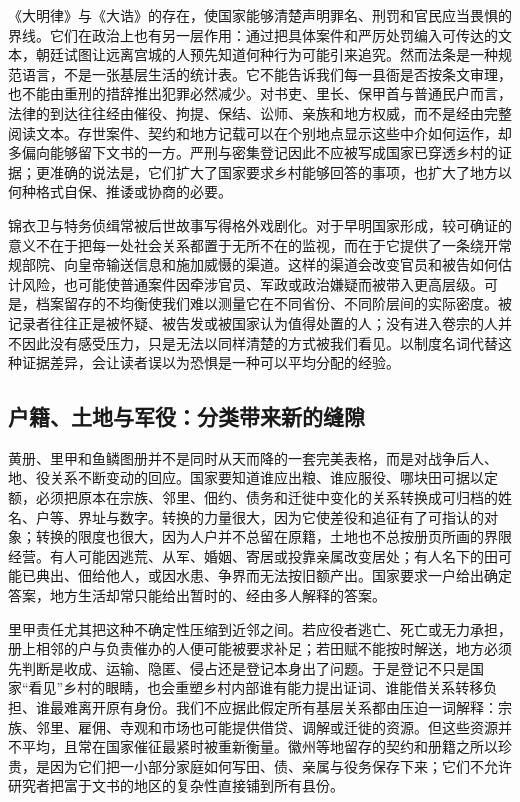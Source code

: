 《大明律》与《大诰》的存在，使国家能够清楚声明罪名、刑罚和官民应当畏惧的界线。它们在政治上也有另一层作用：通过把具体案件和严厉处罚编入可传达的文本，朝廷试图让远离宫城的人预先知道何种行为可能引来追究。然而法条是一种规范语言，不是一张基层生活的统计表。它不能告诉我们每一县衙是否按条文审理，也不能由重刑的措辞推出犯罪必然减少。对书吏、里长、保甲首与普通民户而言，法律的到达往往经由催役、拘提、保结、讼师、亲族和地方权威，而不是经由完整阅读文本。存世案件、契约和地方记载可以在个别地点显示这些中介如何运作，却多偏向能够留下文书的一方。严刑与密集登记因此不应被写成国家已穿透乡村的证据；更准确的说法是，它们扩大了国家要求乡村能够回答的事项，也扩大了地方以何种格式自保、推诿或协商的必要。

锦衣卫与特务侦缉常被后世故事写得格外戏剧化。对于早明国家形成，较可确证的意义不在于把每一处社会关系都置于无所不在的监视，而在于它提供了一条绕开常规部院、向皇帝输送信息和施加威慑的渠道。这样的渠道会改变官员和被告如何估计风险，也可能使普通案件因牵涉官员、军政或政治嫌疑而被带入更高层级。可是，档案留存的不均衡使我们难以测量它在不同省份、不同阶层间的实际密度。被记录者往往正是被怀疑、被告发或被国家认为值得处置的人；没有进入卷宗的人并不因此没有感受压力，只是无法以同样清楚的方式被我们看见。以制度名词代替这种证据差异，会让读者误以为恐惧是一种可以平均分配的经验。

\subsection{户籍、土地与军役：分类带来新的缝隙}

黄册、里甲和鱼鳞图册并不是同时从天而降的一套完美表格，而是对战争后人、地、役关系不断变动的回应。国家要知道谁应出粮、谁应服役、哪块田可据以定额，必须把原本在宗族、邻里、佃约、债务和迁徙中变化的关系转换成可归档的姓名、户等、界址与数字。转换的力量很大，因为它使差役和追征有了可指认的对象；转换的限度也很大，因为人户并不总留在原籍，土地也不总按册页所画的界限经营。有人可能因逃荒、从军、婚姻、寄居或投靠亲属改变居处；有人名下的田可能已典出、佃给他人，或因水患、争界而无法按旧额产出。国家要求一户给出确定答案，地方生活却常只能给出暂时的、经由多人解释的答案。

里甲责任尤其把这种不确定性压缩到近邻之间。若应役者逃亡、死亡或无力承担，册上相邻的户与负责催办的人便可能被要求补足；若田赋不能按时解送，地方必须先判断是收成、运输、隐匿、侵占还是登记本身出了问题。于是登记不只是国家“看见”乡村的眼睛，也会重塑乡村内部谁有能力提出证词、谁能借关系转移负担、谁最难离开原有身份。我们不应据此假定所有基层关系都由压迫一词解释：宗族、邻里、雇佣、寺观和市场也可能提供借贷、调解或迁徙的资源。但这些资源并不平均，且常在国家催征最紧时被重新衡量。徽州等地留存的契约和册籍之所以珍贵，是因为它们把一小部分家庭如何写田、债、亲属与役务保存下来；它们不允许研究者把富于文书的地区的复杂性直接铺到所有县份。

